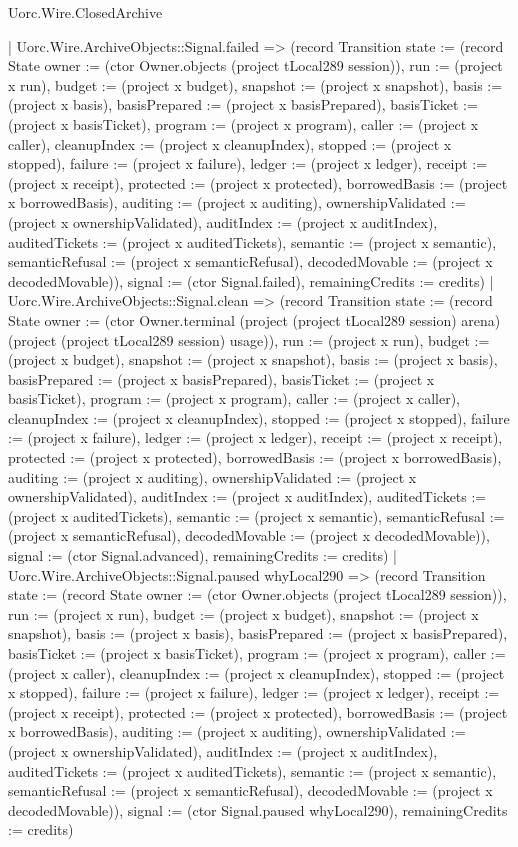 \begin{lexlean}{Uorc.Wire.ClosedArchive}
\begin{semanticmodule}
{      | Uorc.Wire.ArchiveObjects::Signal.failed => (record Transition {state := (record State {owner := (ctor Owner.objects (project tLocal289 session)), run := (project x run), budget := (project x budget), snapshot := (project x snapshot), basis := (project x basis), basisPrepared := (project x basisPrepared), basisTicket := (project x basisTicket), program := (project x program), caller := (project x caller), cleanupIndex := (project x cleanupIndex), stopped := (project x stopped), failure := (project x failure), ledger := (project x ledger), receipt := (project x receipt), protected := (project x protected), borrowedBasis := (project x borrowedBasis), auditing := (project x auditing), ownershipValidated := (project x ownershipValidated), auditIndex := (project x auditIndex), auditedTickets := (project x auditedTickets), semantic := (project x semantic), semanticRefusal := (project x semanticRefusal), decodedMovable := (project x decodedMovable)}), signal := (ctor Signal.failed), remainingCredits := credits})
      | Uorc.Wire.ArchiveObjects::Signal.clean => (record Transition {state := (record State {owner := (ctor Owner.terminal (project (project tLocal289 session) arena) (project (project tLocal289 session) usage)), run := (project x run), budget := (project x budget), snapshot := (project x snapshot), basis := (project x basis), basisPrepared := (project x basisPrepared), basisTicket := (project x basisTicket), program := (project x program), caller := (project x caller), cleanupIndex := (project x cleanupIndex), stopped := (project x stopped), failure := (project x failure), ledger := (project x ledger), receipt := (project x receipt), protected := (project x protected), borrowedBasis := (project x borrowedBasis), auditing := (project x auditing), ownershipValidated := (project x ownershipValidated), auditIndex := (project x auditIndex), auditedTickets := (project x auditedTickets), semantic := (project x semantic), semanticRefusal := (project x semanticRefusal), decodedMovable := (project x decodedMovable)}), signal := (ctor Signal.advanced), remainingCredits := credits})
      | Uorc.Wire.ArchiveObjects::Signal.paused whyLocal290 => (record Transition {state := (record State {owner := (ctor Owner.objects (project tLocal289 session)), run := (project x run), budget := (project x budget), snapshot := (project x snapshot), basis := (project x basis), basisPrepared := (project x basisPrepared), basisTicket := (project x basisTicket), program := (project x program), caller := (project x caller), cleanupIndex := (project x cleanupIndex), stopped := (project x stopped), failure := (project x failure), ledger := (project x ledger), receipt := (project x receipt), protected := (project x protected), borrowedBasis := (project x borrowedBasis), auditing := (project x auditing), ownershipValidated := (project x ownershipValidated), auditIndex := (project x auditIndex), auditedTickets := (project x auditedTickets), semantic := (project x semantic), semanticRefusal := (project x semanticRefusal), decodedMovable := (project x decodedMovable)}), signal := (ctor Signal.paused whyLocal290), remainingCredits := credits})
}
\end{semanticmodule}
\end{lexlean}

